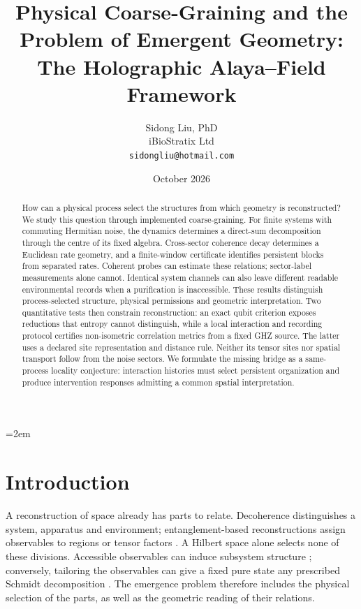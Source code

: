 \documentclass[12pt,a4paper]{article}
\title{Physical Coarse-Graining and the Problem of Emergent Geometry:\\
The Holographic Alaya--Field Framework}
\author{
  Sidong Liu, PhD \\[0.6ex]
  iBioStratix Ltd \\[0.8ex]
  \texttt{sidongliu@hotmail.com}
}
\date{October 2026}
\begin{document}
\emergencystretch=2em
\raggedbottom
{}

\maketitle

\begin{abstract}
How can a physical process select the structures from which geometry is reconstructed? We study this question through implemented coarse-graining. For finite systems with commuting Hermitian noise, the dynamics determines a direct-sum decomposition through the centre of its fixed algebra. Cross-sector coherence decay determines a Euclidean rate geometry, and a finite-window certificate identifies persistent blocks from separated rates. Coherent probes can estimate these relations; sector-label measurements alone cannot. Identical system channels can also leave different readable environmental records when a purification is inaccessible. These results distinguish process-selected structure, physical permissions and geometric interpretation. Two quantitative tests then constrain reconstruction: an exact qubit criterion exposes reductions that entropy cannot distinguish, while a local interaction and recording protocol certifies non-isometric correlation metrics from a fixed GHZ source. The latter uses a declared site representation and distance rule. Neither its tensor sites nor spatial transport follow from the noise sectors. We formulate the missing bridge as a same-process locality conjecture: interaction histories must select persistent organization and produce intervention responses admitting a common spatial interpretation.
\end{abstract}

\section{Introduction}
\label{sec:intro}

A reconstruction of space already has parts to relate. Decoherence
distinguishes a system, apparatus and environment; entanglement-based
reconstructions assign observables to regions or tensor factors
\cite{Zurek2003,RyuTakayanagi2006,VanRaamsdonk2010}. A Hilbert space
alone selects none of these divisions. Accessible observables can induce
subsystem structure \cite{Zanardi2001,Zanardi2004,Viola2004}; conversely, tailoring
the observables can give a fixed pure state any prescribed Schmidt
decomposition \cite{HarshmanRanade2011}. The emergence problem therefore
includes the physical selection of the parts, as well as the geometric
reading of their relations.
\end{document}
